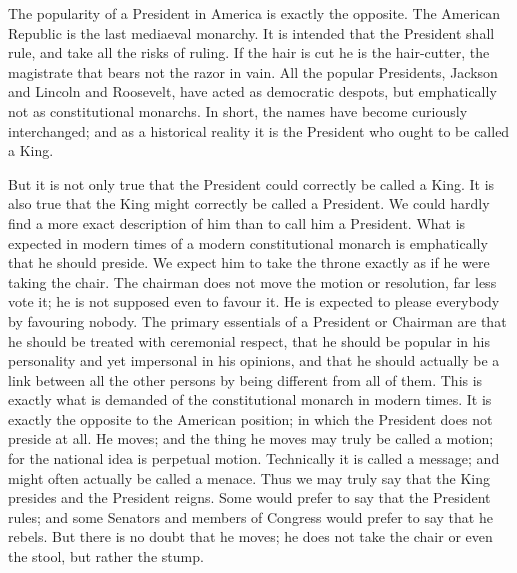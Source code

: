 \documentclass{book}
\begin{document}
The popularity of a President in America is exactly the opposite. The American Republic is the last mediaeval monarchy. It is intended that the President shall rule, and take all the risks of ruling. If the hair is cut he is the hair-cutter, the magistrate that bears not the razor in vain. All the popular Presidents, Jackson and Lincoln and Roosevelt, have acted as democratic despots, but emphatically not as constitutional monarchs. In short, the names have become curiously interchanged; and as a historical reality it is the President who ought to be called a King.

But it is not only true that the President could correctly be called a King. It is also true that the King might correctly be called a President. We could hardly find a more exact description of him than to call him a President. What is expected in modern times of a modern constitutional monarch is emphatically that he should preside. We expect him to take the throne exactly as if he were taking the chair. The chairman does not move the motion or resolution, far less vote it; he is not supposed even to favour it. He is expected to please everybody by favouring nobody. The primary essentials of a President or Chairman are that he should be treated with ceremonial respect, that he should be popular in his personality and yet impersonal in his opinions, and that he should actually be a link between all the other persons by being different from all of them. This is exactly what is demanded of the constitutional monarch in modern times. It is exactly the opposite to the American position; in which the President does not preside at all. He moves; and the thing he moves may truly be called a motion; for the national idea is perpetual motion. Technically it is called a message; and might often actually be called a menace. Thus we may truly say that the King presides and the President reigns. Some would prefer to say that the President rules; and some Senators and members of Congress would prefer to say that he rebels. But there is no doubt that he moves; he does not take the chair or even the stool, but rather the stump.
\end{document}
